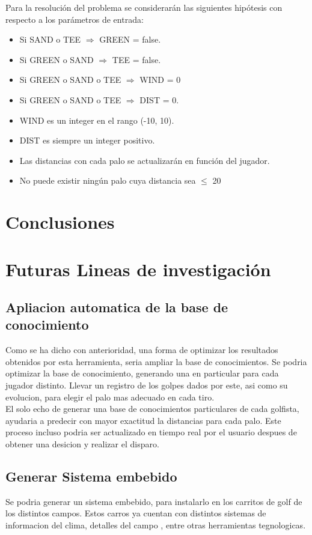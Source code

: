 \documentclass[runningheads,a4paper]{llncs}
\begin{document}
Para la resolución del problema se considerarán las siguientes hipótesis con respecto a los parámetros de entrada:\\
\begin{itemize}
	\item Si SAND o TEE $\Rightarrow$ GREEN = false.
	\item Si GREEN o SAND $\Rightarrow$ TEE = false.
	\item Si GREEN o SAND o TEE $\Rightarrow$ WIND = 0 
	\item Si GREEN o SAND o TEE $\Rightarrow$ DIST = 0.
	\item WIND es un integer en el rango (-10, 10).
	\item DIST es siempre un integer positivo.
	\item Las distancias con cada palo se actualizarán en función del jugador.
	\item No puede existir ningún palo cuya distancia sea $\leq$ 20
\end{itemize}


\section{Conclusiones}

\section{Futuras Lineas de investigación}
\subsection{Apliacion automatica de la base de conocimiento}
Como se ha dicho con anterioridad, una forma de optimizar los resultados obtenidos por esta herramienta,
seria ampliar la base de conocimientos. Se podria optimizar la base de conocimiento, generando una en particular para cada jugador distinto. Llevar un registro de los golpes dados por este, 
asi como su evolucion, para elegir el palo mas adecuado en cada tiro.\\
El solo echo de generar una base de conocimientos particulares de cada golfista, ayudaria a predecir con 
mayor exactitud la distancias para cada palo. Este proceso incluso podria ser actualizado en tiempo real por el usuario despues de obtener una desicion y realizar el disparo.\\
\subsection{Generar Sistema embebido}
Se podria generar un sistema embebido, para instalarlo en los carritos de golf de los distintos campos. Estos carros ya cuentan con distintos sistemas de informacion del clima, detalles del campo , entre otras herramientas tegnologicas. 
\end{document}
